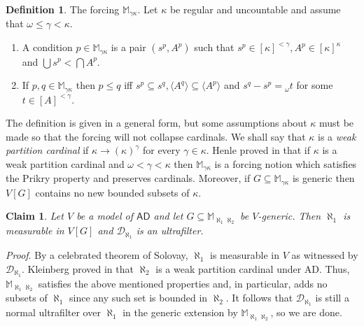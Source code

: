 \documentclass[11pt]{amsart}
\newtheorem{claim}[theorem]{Claim}
\theoremstyle{definition}
\newtheorem{definition}[theorem]{Definition}
\theoremstyle{remark}
\begin{document}
\begin{definition} \label{defmagidorlike} The forcing $\mathbb{M}_{\gamma\kappa}$. \newline
  Let $\kappa$ be regular and uncountable and assume that $\omega\leq\gamma<\kappa$.
  \begin{enumerate}
    \item [$(\aleph)$] A condition $p\in\mathbb{M}_{\gamma\kappa}$ is a pair $(s^p,A^p)$ such that $s^p\in[\kappa]^{<\gamma}, A^p\in[\kappa]^\kappa$ and $\bigcup{s^p}<\bigcap{A^p}$.
    \item [$(\beth)$] If $p,q\in\mathbb{M}_{\gamma\kappa}$ then $p\leq{q}$ iff $s^p\subseteq{s^q}, \langle{A^q}\rangle\subseteq\langle{A^p}\rangle$ and $s^q-s^p={}_\omega{t}$ for some $t\in[A]^{<\gamma}$.
  \end{enumerate}
\end{definition}

The definition is given in a general form, but some assumptions about $\kappa$ must be made so that the forcing will not collapse cardinals.
We shall say that $\kappa$ is a \emph{weak partition cardinal} if $\kappa\rightarrow(\kappa)^\gamma$ for every $\gamma\in\kappa$.
Henle proved in \cite{MR722169} that if $\kappa$ is a weak partition cardinal and $\omega<\gamma<\kappa$ then $\mathbb{M}_{\gamma\kappa}$ is a forcing notion which satisfies the Prikry property and preserves cardinals.
Moreover, if $G\subseteq\mathbb{M}_{\gamma\kappa}$ is generic then $V[G]$ contains no new bounded subsets of $\kappa$.

\begin{claim} \label{clmpreservation}
  Let $V$ be a model of $\mathsf{AD}$ and let $G\subseteq\mathbb{M}_{\aleph_1\aleph_2}$ be $V$-generic.
  Then $\aleph_1$ is measurable in $V[G]$ and $\mathscr{D}_{\aleph_1}$ is an ultrafilter.
\end{claim}

\par\noindent\emph{Proof}. \newline
By a celebrated theorem of Solovay, $\aleph_1$ is measurable in $V$ as witnessed by $\mathscr{D}_{\aleph_1}$.
Kleinberg proved in \cite{MR0479903} that $\aleph_2$ is a weak partition cardinal under \textsf{AD}.
Thus, $\mathbb{M}_{\aleph_1\aleph_2}$ satisfies the above mentioned properties and, in particular, adds no subsets of $\aleph_1$ since any such set is bounded in $\aleph_2$.
It follows that $\mathscr{D}_{\aleph_1}$ is still a normal ultrafilter over $\aleph_1$ in the generic extension by $\mathbb{M}_{\aleph_1\aleph_2}$, so we are done.
\end{document}
